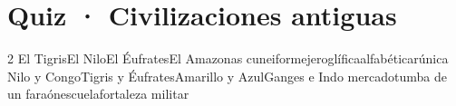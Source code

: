 

\renewcommand{\hdrcapitulo}{Ejemplo · Guías del Profe}



\section{Quiz · Civilizaciones antiguas}

\begin{evaluacion}[20 minutos]
\begin{multicols}{2}
  {El Tigris}{El Nilo}{El Éufrates}{El Amazonas}
  {cuneiforme}{jeroglífica}{alfabética}{rúnica}
  {Nilo y Congo}{Tigris y Éufrates}{Amarillo y Azul}{Ganges e Indo}
  {mercado}{tumba de un faraón}{escuela}{fortaleza militar}
\end{multicols}
\end{evaluacion}


